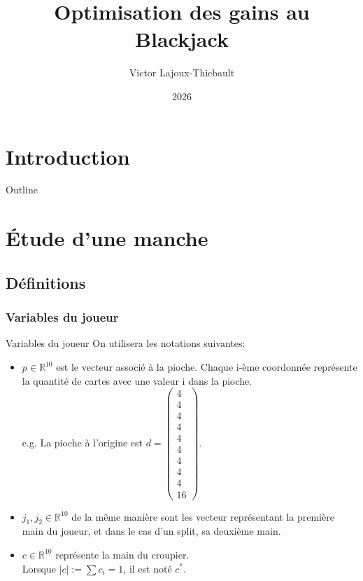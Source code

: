 \documentclass{beamer}
\title{Optimisation des gains au Blackjack}
\author{Victor Lajoux-Thiebault}
\date{2026}
\begin{document}
\section{Introduction}

\begin{frame}
	\titlepage
\end{frame}

\begin{frame}{Outline}
	\setcounter{tocdepth}{2}
	\tableofcontents
\end{frame}

\section{Étude d'une manche}
\subsection{Définitions}
\subsubsection{Variables du joueur}

\begin{frame}{Variables du joueur}
	On utilisera les notations suivantes:
	\begin{itemize}
		\item $p \in \mathbb{R}^{10} $ est le vecteur associé à la pioche. Chaque i-ème coordonnée représente la quantité de cartes avec une valeur i dans la pioche. \\{} e.g.  
		La pioche à l'origine est $d = \left(\begin{smallmatrix} 4 \\ 4 \\ 4 \\ 4 \\ 4 \\ 4 \\ 4 \\ 4 \\ 4 \\ 16 \end{smallmatrix}\right)$.
		\item $j_1, j_2 \in \mathbb{R}^{10}$ de la même manière sont les vecteur représentant la première main du joueur, et dans le cas d'un split, sa deuxième main.
		\item $c \in \mathbb{R}^{10}$ représente la main du croupier. \\{} 
		Lorsque $|c| := \sum c_i = 1$, il est noté $c^{*}$.
	\end{itemize}
\end{frame}
\end{document}
